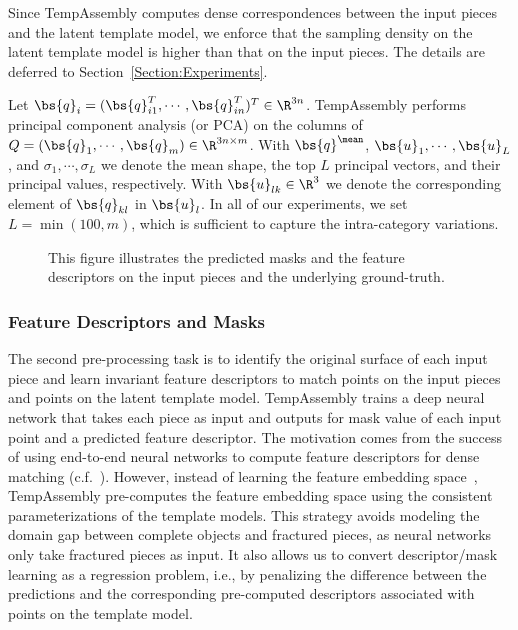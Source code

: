 Since TempAssembly computes dense correspondences between the input pieces and the latent template model, we enforce that the sampling density on the latent template model is higher than that on the input pieces. The details are deferred to Section~\ref{Section:Experiments}. 

Let $\bs{q}_i = (\bs{q}_{i1}^T,\cdots, \bs{q}_{in}^T)^T\in \R^{3n}$. TempAssembly performs principal component analysis (or PCA) on the columns of $Q = (\bs{q}_1,\cdots, \bs{q}_m)\in \R^{3n\times m}$. With $\bs{q}^{\mean}$, $\bs{u}_1,\cdots, \bs{u}_{L}$, and $\sigma_1,\cdots, \sigma_{L}$ we denote the mean shape, the top $L$ principal vectors, and their principal values, respectively. With $\bs{u}_{lk}\in \R^3$ we denote the corresponding element of $\bs{q}_{kl}$ in $\bs{u}_l$. In all of our experiments, we set $L = \min(100, m)$, which is sufficient to capture the intra-category variations.


\begin{figure*}
\vspace{2in}
\caption{This figure illustrates the predicted masks and the feature descriptors on the input pieces and the underlying ground-truth.}
\label{Figure:Feature:Descriptor}
\end{figure*}

\subsubsection{Feature Descriptors and Masks} The second pre-processing task is to identify the original surface of each input piece and learn invariant feature descriptors to match points on the input pieces and points on the latent template model. TempAssembly trains a deep neural network that takes each piece as input and outputs for mask value of each input point and a predicted feature descriptor. The motivation comes from the success of using end-to-end neural networks to compute feature descriptors for dense matching (c.f.~\cite{DBLP:conf/cvpr/WeiHCVL16}). However, instead of learning the feature embedding space~\cite{DBLP:conf/cvpr/WeiHCVL16}, TempAssembly pre-computes the feature embedding space using the consistent parameterizations of the template models. This strategy avoids modeling the domain gap between complete objects and fractured pieces, as neural networks only take fractured pieces as input. It also allows us to convert descriptor/mask learning as a regression problem, i.e., by penalizing the difference between the predictions and the corresponding pre-computed descriptors associated with points on the template model. 

